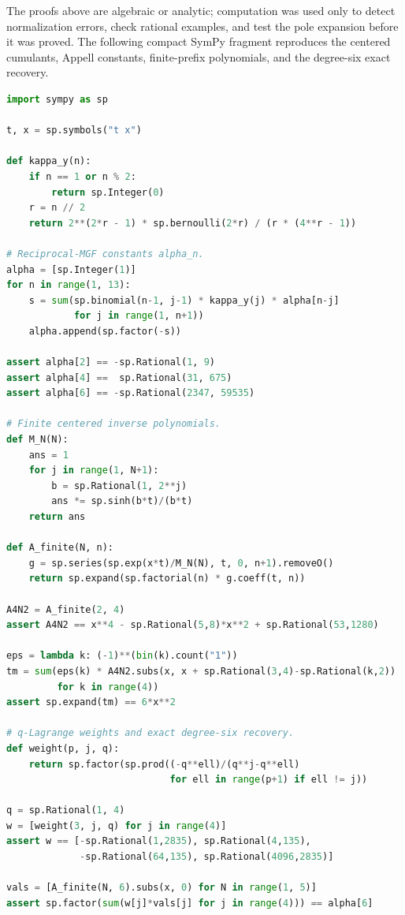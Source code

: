 \documentclass[11pt,oneside]{article}
\numberwithin{equation}{section}
\theoremstyle{definition}
\theoremstyle{remark}
\begin{document}
The proofs above are algebraic or analytic; computation was used only to detect normalization errors,
check rational examples, and test the pole expansion before it was proved.  The following compact
SymPy fragment reproduces the centered cumulants, Appell constants, finite-prefix polynomials, and
the degree-six exact recovery.

\begin{lstlisting}[style=frontiercode,language=Python,caption={Exact symbolic checks for the centered Appell sequence.}]
import sympy as sp

t, x = sp.symbols("t x")

def kappa_y(n):
    if n == 1 or n % 2:
        return sp.Integer(0)
    r = n // 2
    return 2**(2*r - 1) * sp.bernoulli(2*r) / (r * (4**r - 1))

# Reciprocal-MGF constants alpha_n.
alpha = [sp.Integer(1)]
for n in range(1, 13):
    s = sum(sp.binomial(n-1, j-1) * kappa_y(j) * alpha[n-j]
            for j in range(1, n+1))
    alpha.append(sp.factor(-s))

assert alpha[2] == -sp.Rational(1, 9)
assert alpha[4] ==  sp.Rational(31, 675)
assert alpha[6] == -sp.Rational(2347, 59535)

# Finite centered inverse polynomials.
def M_N(N):
    ans = 1
    for j in range(1, N+1):
        b = sp.Rational(1, 2**j)
        ans *= sp.sinh(b*t)/(b*t)
    return ans

def A_finite(N, n):
    g = sp.series(sp.exp(x*t)/M_N(N), t, 0, n+1).removeO()
    return sp.expand(sp.factorial(n) * g.coeff(t, n))

A4N2 = A_finite(2, 4)
assert A4N2 == x**4 - sp.Rational(5,8)*x**2 + sp.Rational(53,1280)

eps = lambda k: (-1)**(bin(k).count("1"))
tm = sum(eps(k) * A4N2.subs(x, x + sp.Rational(3,4)-sp.Rational(k,2))
         for k in range(4))
assert sp.expand(tm) == 6*x**2

# q-Lagrange weights and exact degree-six recovery.
def weight(p, j, q):
    return sp.factor(sp.prod((-q**ell)/(q**j-q**ell)
                             for ell in range(p+1) if ell != j))

q = sp.Rational(1, 4)
w = [weight(3, j, q) for j in range(4)]
assert w == [-sp.Rational(1,2835), sp.Rational(4,135),
             -sp.Rational(64,135), sp.Rational(4096,2835)]

vals = [A_finite(N, 6).subs(x, 0) for N in range(1, 5)]
assert sp.factor(sum(w[j]*vals[j] for j in range(4))) == alpha[6]
\end{lstlisting}
\end{document}
